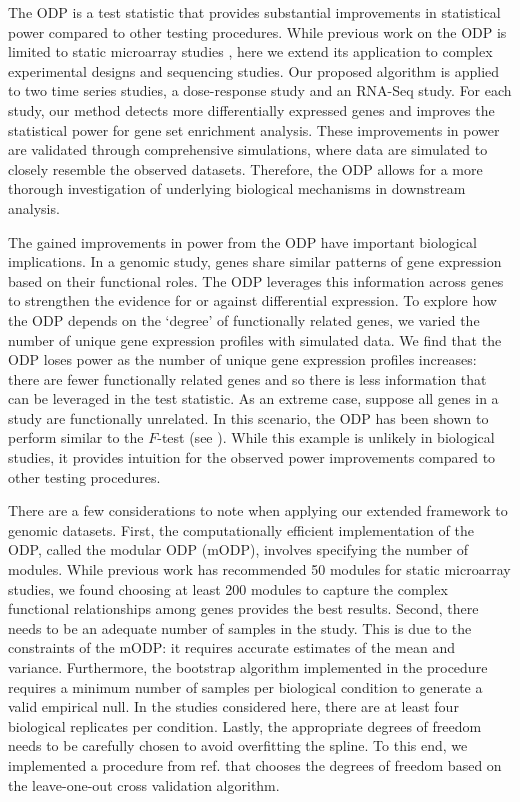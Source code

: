 \documentclass[11pt]{article}
\begin{document}
The ODP is a test statistic that provides substantial improvements in statistical power compared to other testing procedures. While previous work on the ODP is limited to static microarray studies \citep{Storey_2006, Storey_2007_odp, Woo_2010}, here we extend its application to complex experimental designs and sequencing studies. Our proposed algorithm is applied to two time series studies, a dose-response study and an RNA-Seq study. For each study, our method detects more differentially expressed genes and improves the statistical power for gene set enrichment analysis. These improvements in power are validated through comprehensive simulations, where data are simulated to closely resemble the observed datasets. Therefore, the ODP allows for a more thorough investigation of underlying biological mechanisms in downstream analysis. 

The gained improvements in power from the ODP have important biological implications. In a genomic study, genes share similar patterns of gene expression based on their functional roles. The ODP leverages this information across genes to strengthen the evidence for or against differential expression. To explore how the ODP depends on the `degree' of functionally related genes, we varied the number of unique gene expression profiles with simulated data. We find that the ODP loses power as the number of unique gene expression profiles increases: there are fewer functionally related genes and so there is less information that can be leveraged in the test statistic. As an extreme case, suppose all genes in a study are functionally unrelated. In this scenario, the ODP has been shown to perform similar to the $F$-test (see \cite{Storey_2006}). While this example is unlikely in biological studies, it provides intuition for the observed power improvements compared to other testing procedures.

There are a few considerations to note when applying our extended framework to genomic datasets. First, the computationally efficient implementation of the ODP, called the modular ODP (mODP), involves specifying the number of modules. While previous work has recommended 50 modules for static microarray studies, we found choosing at least 200 modules to capture the complex functional relationships among genes provides the best results. Second, there needs to be an adequate number of samples in the study. This is due to the constraints of the mODP: it requires accurate estimates of the mean and variance. Furthermore, the bootstrap algorithm implemented in the procedure requires a minimum number of samples per biological condition to generate a valid empirical null. In the studies considered here, there are at least four biological replicates per condition. Lastly, the appropriate degrees of freedom needs to be carefully chosen to avoid overfitting the spline. To this end, we implemented a procedure from ref. \cite{Storey_2005_time} that chooses the degrees of freedom based on the leave-one-out cross validation algorithm.
\end{document}
